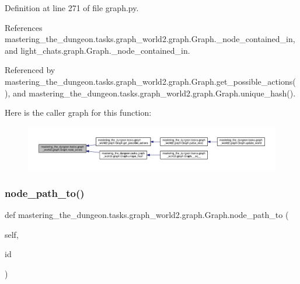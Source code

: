 Definition at line 271 of file graph.\+py.



References mastering\+\_\+the\+\_\+dungeon.\+tasks.\+graph\+\_\+world2.\+graph.\+Graph.\+\_\+node\+\_\+contained\+\_\+in, and light\+\_\+chats.\+graph.\+Graph.\+\_\+node\+\_\+contained\+\_\+in.



Referenced by mastering\+\_\+the\+\_\+dungeon.\+tasks.\+graph\+\_\+world2.\+graph.\+Graph.\+get\+\_\+possible\+\_\+actions(), and mastering\+\_\+the\+\_\+dungeon.\+tasks.\+graph\+\_\+world2.\+graph.\+Graph.\+unique\+\_\+hash().

Here is the caller graph for this function\+:
\nopagebreak
\begin{figure}[H]
\begin{center}
\leavevmode
\includegraphics[width=350pt]{classmastering__the__dungeon_1_1tasks_1_1graph__world2_1_1graph_1_1Graph_a04d9e981dfe42dd636a17e808f7821cc_icgraph}
\end{center}
\end{figure}
\mbox{\label{classmastering__the__dungeon_1_1tasks_1_1graph__world2_1_1graph_1_1Graph_a289dcd73f6496ab0f16ed1d76cfe797b}} 
\subsubsection{\texorpdfstring{node\+\_\+path\+\_\+to()}{node\_path\_to()}}
{\footnotesize\ttfamily def mastering\+\_\+the\+\_\+dungeon.\+tasks.\+graph\+\_\+world2.\+graph.\+Graph.\+node\+\_\+path\+\_\+to (\begin{DoxyParamCaption}\item[{}]{self,  }\item[{}]{id }\end{DoxyParamCaption})}



